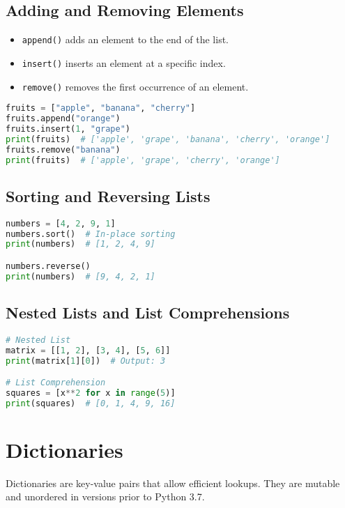 \documentclass{article}
\begin{document}
\subsection{Adding and Removing Elements}
\begin{itemize}
    \item \texttt{append()} adds an element to the end of the list.
    \item \texttt{insert()} inserts an element at a specific index.
    \item \texttt{remove()} removes the first occurrence of an element.
\end{itemize}
\begin{lstlisting}[language=Python]
fruits = ["apple", "banana", "cherry"]
fruits.append("orange")
fruits.insert(1, "grape")
print(fruits)  # ['apple', 'grape', 'banana', 'cherry', 'orange']
fruits.remove("banana")
print(fruits)  # ['apple', 'grape', 'cherry', 'orange']
\end{lstlisting}

\subsection{Sorting and Reversing Lists}
\begin{lstlisting}[language=Python]
numbers = [4, 2, 9, 1]
numbers.sort()  # In-place sorting
print(numbers)  # [1, 2, 4, 9]

numbers.reverse()
print(numbers)  # [9, 4, 2, 1]
\end{lstlisting}

\subsection{Nested Lists and List Comprehensions}
\begin{lstlisting}[language=Python]
# Nested List
matrix = [[1, 2], [3, 4], [5, 6]]
print(matrix[1][0])  # Output: 3

# List Comprehension
squares = [x**2 for x in range(5)]
print(squares)  # [0, 1, 4, 9, 16]
\end{lstlisting}


\section{Dictionaries}
Dictionaries are key-value pairs that allow efficient lookups. They are mutable and unordered in versions prior to Python 3.7.
\end{document}

